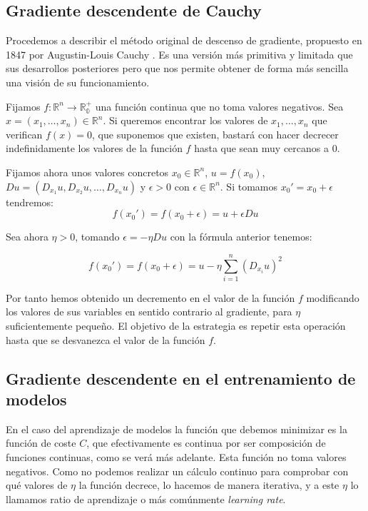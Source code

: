 \subsection{Gradiente descendente de Cauchy}

Procedemos a describir el método original de descenso de gradiente, propuesto en 1847 por Augustin-Louis Cauchy \cite{CauchyGD}. Es una versión más primitiva y limitada que sus desarrollos posteriores pero que nos permite obtener de forma más sencilla una visión de su funcionamiento. 

Fijamos $f:\mathbb{R}^n \rightarrow \mathbb{R^{+}_0}$ una función continua que no toma valores negativos. Sea $x= \left ( x_1,\ldots,x_n \right ) \in \mathbb{R}^n$. Si queremos encontrar los valores de $x_1,\ldots,x_n$ que verifican $f(x)=0$, que suponemos que existen, bastará con hacer decrecer indefinidamente los valores de la función $f$ hasta que sean muy cercanos a $0$. 

Fijamos ahora unos valores concretos $x_0 \in \mathbb{R}^n$, $u=f(x_0)$,\\ $Du= \left ( D_{x_1}u, D_{x_2}u, \ldots, D_{x_n}u \right )$ y $\epsilon >0$ con $\epsilon \in \mathbb{R}^n$. Si tomamos $x_0'=x_0+\epsilon$ tendremos:
$$f(x_0')= f(x_0 + \epsilon) = u + \epsilon Du$$

Sea ahora $\eta >0$, tomando $\epsilon= - \eta Du$ con la fórmula anterior tenemos: 

$$f(x_0') = f(x_0 + \epsilon) = u - \eta \sum_{i=1}^{n}(D_{x_i}u)^2$$

Por tanto hemos obtenido un decremento en el valor de la función $f$ modificando los valores de sus variables en sentido contrario al gradiente, para $\eta$ suficientemente pequeño. El objetivo de la estrategia es repetir esta operación hasta que se desvanezca el valor de la función $f$.




\subsection{Gradiente descendente en el entrenamiento de modelos}

En el caso del aprendizaje de modelos la función que debemos minimizar es la función de coste $C$, que efectivamente es continua por ser composición de funciones continuas, como se verá más adelante. Esta función no toma valores negativos. Como no podemos realizar un cálculo continuo para comprobar con qué valores de $\eta$ la función decrece, lo hacemos de manera iterativa, y a este $\eta$ lo llamamos ratio de aprendizaje o más comúnmente \textit{learning rate}. 

